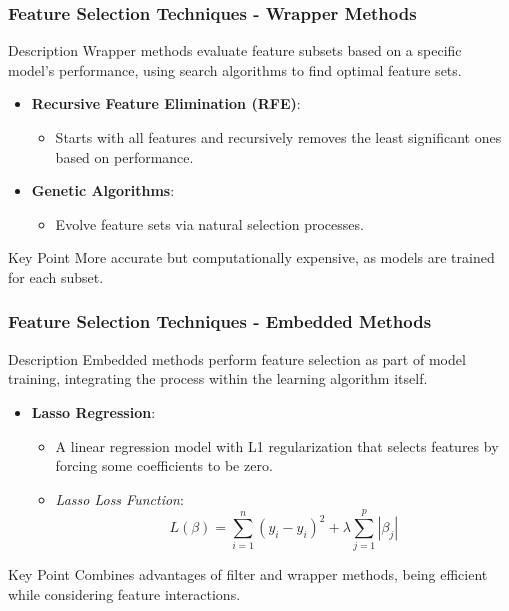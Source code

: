 \documentclass[aspectratio=169]{beamer}
\begin{document}
\begin{frame}[fragile]
    \frametitle{Feature Selection Techniques - Wrapper Methods}
    \begin{block}{Description}
        Wrapper methods evaluate feature subsets based on a specific model's performance, using search algorithms to find optimal feature sets.
    \end{block}
    
    \begin{itemize}
        \item \textbf{Recursive Feature Elimination (RFE)}:
            \begin{itemize}
                \item Starts with all features and recursively removes the least significant ones based on performance.
            \end{itemize}
        
        \item \textbf{Genetic Algorithms}:
            \begin{itemize}
                \item Evolve feature sets via natural selection processes.
            \end{itemize}
    \end{itemize}

    \begin{block}{Key Point}
        More accurate but computationally expensive, as models are trained for each subset.
    \end{block}
\end{frame}

\begin{frame}[fragile]
    \frametitle{Feature Selection Techniques - Embedded Methods}
    \begin{block}{Description}
        Embedded methods perform feature selection as part of model training, integrating the process within the learning algorithm itself.
    \end{block}
    
    \begin{itemize}
        \item \textbf{Lasso Regression}:
            \begin{itemize}
                \item A linear regression model with L1 regularization that selects features by forcing some coefficients to be zero.
                \item \textit{Lasso Loss Function}:
                \begin{equation}
                L(\beta) = \sum_{i=1}^{n} (y_i - \hat{y}_i)^2 + \lambda \sum_{j=1}^{p} |\beta_j|
                \end{equation}
            \end{itemize}
    \end{itemize}
    
    \begin{block}{Key Point}
        Combines advantages of filter and wrapper methods, being efficient while considering feature interactions.
    \end{block}
\end{frame}
\end{document}
